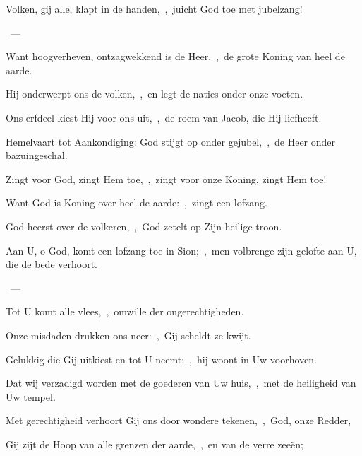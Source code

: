 \documentclass[12pt,twoside,a5paper]{article}
\begin{document}





\begin{halfparskip}
  Volken, gij alle, klapt in de handen,~\sep\ juicht God toe met jubelzang!

  ~--- 

  Want hoogverheven, ontzagwekkend is de Heer,~\sep\ de grote Koning van heel de aarde.

  Hij onderwerpt ons de volken,~\sep\ en legt de naties onder onze voeten.

  Ons erfdeel kiest Hij voor ons uit,~\sep\ de roem van Jacob, die Hij liefheeft.

  Hemelvaart tot Aankondiging: God stijgt op onder gejubel,~\sep\ de Heer onder bazuingeschal.

  Zingt voor God, zingt Hem toe,~\sep\ zingt voor onze Koning, zingt Hem toe!

  Want God is Koning over heel de aarde:~\sep\ zingt een lofzang.

  God heerst over de volkeren,~\sep\ God zetelt op Zijn heilige troon.
\end{halfparskip}


\begin{halfparskip}
  Aan U, o God, komt een lofzang toe in Sion;~\sep\ men volbrenge zijn gelofte aan U, die de bede verhoort.

  ~--- 

  Tot U komt alle vlees,~\sep\ omwille der ongerechtigheden.

  Onze misdaden drukken ons neer:~\sep\ Gij scheldt ze kwijt.

  Gelukkig die Gij uitkiest en tot U neemt:~\sep\ hij woont in Uw voorhoven.

  Dat wij verzadigd worden met de goederen van Uw huis,~\sep\ met de heiligheid van Uw tempel.

  Met gerechtigheid verhoort Gij ons door wondere tekenen,~\sep\ God, onze Redder,

  Gij zijt de Hoop van alle grenzen der aarde,~\sep\ en van de verre zeeën;
\end{halfparskip}
\end{document}
